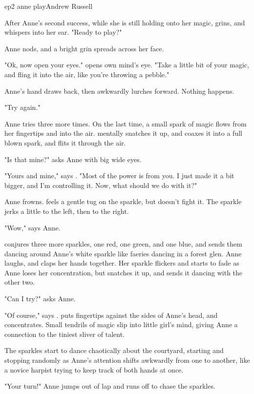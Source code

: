 \documentclass{book}
\begin{document}
\begin{childnode}{ep2 anne play}{Andrew Russell}

    After Anne's second success, while she is still holding onto her magic, \name{} grins, and whispers into her ear. "Ready to play?"

    Anne nods, and a bright grin spreads across her face.

    "Ok, now open your eyes." \name{} opens \hisher{} own mind's eye. "Take a little bit of your magic, and fling it into the air, like you're throwing a pebble."

    Anne's hand draws back, then awkwardly lurches forward. Nothing happens.

    "Try again."

    Anne tries three more times. On the last time, a small spark of magic flows from her fingertips and into the air. \name{} mentally snatches it up, and coaxes it into a full blown spark, and flits it through the air.

    "Is that mine?" asks Anne with big wide eyes.

    "Yours and mine," says \name{}. "Most of the power is from you. I just made it a bit bigger, and I'm controlling it. Now, what should we do with it?"

    Anne frowns. \name{} feels a gentle tug on the sparkle, but doesn't fight it. The sparkle jerks a little to the left, then to the right.

    "Wow," says Anne.

    \name{} conjures three more sparkles, one red, one green, and one blue, and sends them dancing around Anne's white sparkle like faeries dancing in a forest glen. Anne laughs, and claps her hands 
    together. Her sparkle flickers and starts to fade as Anne loses her
    concentration, but \name{} snatches it up, and sends it dancing with the other two.

    "Can I try?" asks Anne.

    "Of course," says \name{}. \HeShe{} puts \hisher{} fingertips against the sides of Anne's head, and concentrates. Small tendrils of magic slip into little girl's mind, giving Anne a connection 
    to the tiniest sliver of \names{} talent.

    The sparkles start to dance chaotically about the courtyard, starting and stopping randomly as Anne's attention shifts awkwardly from one to another, like a novice harpist trying to keep track of both hands at once.

    "Your turn!" Anne jumps out of \names{} lap and runs off to chase the sparkles.


\end{childnode}
\end{document}
